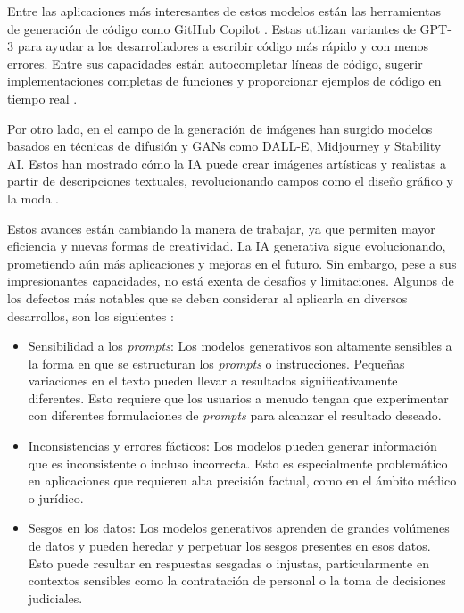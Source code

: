 Entre las aplicaciones más interesantes de estos modelos están las herramientas de generación de código como GitHub Copilot \citep{GitHubCopilot2023}. Estas utilizan variantes de GPT-3 para ayudar a los desarrolladores a escribir código más rápido y con menos errores. Entre sus capacidades están autocompletar líneas de código, sugerir implementaciones completas de funciones y proporcionar ejemplos de código en tiempo real \citep{GitHubCopilot2023}. 

Por otro lado, en el campo de la generación de imágenes han surgido modelos basados en técnicas de difusión y GANs como DALL-E, Midjourney y Stability AI. Estos han mostrado cómo la IA puede crear imágenes artísticas y realistas a partir de descripciones textuales, revolucionando campos como el diseño gráfico y la moda \citep{BattleOfCreativity2024}.

Estos avances están cambiando la manera de trabajar, ya que permiten mayor eficiencia y nuevas formas de creatividad. La IA generativa sigue evolucionando, prometiendo aún más aplicaciones y mejoras en el futuro. Sin embargo, pese a sus impresionantes capacidades, no está exenta de desafíos y limitaciones. Algunos de los defectos más notables que se deben considerar al aplicarla en diversos desarrollos, son los siguientes \citep{TowardsAI2024}:

\begin{itemize}
    \item Sensibilidad a los \textit{prompts}: Los modelos generativos son altamente sensibles a la forma en que se estructuran los \textit{prompts} o instrucciones. Pequeñas variaciones en el texto pueden llevar a resultados significativamente diferentes. Esto requiere que los usuarios a menudo tengan que experimentar con diferentes formulaciones de \textit{prompts} para alcanzar el resultado deseado.
    \item Inconsistencias y errores fácticos: Los modelos pueden generar información que es inconsistente o incluso incorrecta. Esto es especialmente problemático en aplicaciones que requieren alta precisión factual, como en el ámbito médico o jurídico.
    \item Sesgos en los datos: Los modelos generativos aprenden de grandes volúmenes de datos y pueden heredar y perpetuar los sesgos presentes en esos datos. Esto puede resultar en respuestas sesgadas o injustas, particularmente en contextos sensibles como la contratación de personal o la toma de decisiones judiciales.
\end{itemize}


